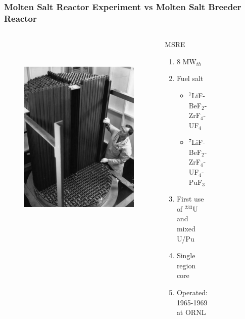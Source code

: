 \begin{frame}
  \frametitle{Molten Salt Reactor Experiment vs Molten Salt Breeder Reactor}
  \begin{columns}
    \column[t]{5.6cm}
               \begin{figure}[t]
                \vspace*{-0.3in}
                \includegraphics[height=0.7\textwidth]{./images/msre_view.png}
                \vspace*{-0.2in}
      \end{figure}
     \begin{block}{\gls{MSRE}}
       \begin{enumerate}
              \item 8 MW$_{th}$
               \item Fuel salt
                \begin{itemize}
                   \item $^7$LiF-BeF$_2$-ZrF$_4$-UF$_4$
                   \item $^7$LiF-BeF$_2$-ZrF$_4$-UF$_4$-PuF$_3$
                \end{itemize}  
              \item First use of $^{233}$U and mixed U/Pu
              \item Single region core
              \item Operated: 1965-1969 at ORNL
              \end{enumerate}
     \end{block}
     \column[t]{5.6cm}
           \begin{figure}[t]
                \vspace*{-0.3in}

\end{figure}
\end{columns}
\end{frame}
